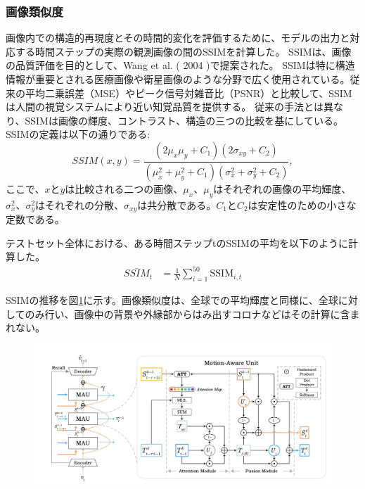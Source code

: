       \subsubsection{画像類似度}
        画像内での構造的再現度とその時間的変化を評価するために、モデルの出力と対応する時間ステップの実際の観測画像の間のSSIMを計算した。
        SSIMは、画像の品質評価を目的として、Wang et al. ( 2004 )\cite{wang2004image}で提案された。
        SSIMは特に構造情報が重要とされる医療画像や衛星画像のような分野で広く使用されている。従来の平均二乗誤差（MSE）やピーク信号対雑音比（PSNR）と比較して、SSIMは人間の視覚システムにより近い知覚品質を提供する。
        従来の手法とは異なり、SSIMは画像の輝度、コントラスト、構造の三つの比較を基にしている。
        SSIMの定義は以下の通りである:
        \begin{equation}
          SSIM(x, y) = \frac{(2\mu_x \mu_y + C_1)(2\sigma_{xy} + C_2)}{(\mu_x^2 + \mu_y^2 + C_1)(\sigma_x^2 + \sigma_y^2 + C_2)},     
        \end{equation}
        ここで、$x$と$y$は比較される二つの画像、$\mu_x$、$\mu_y$はそれぞれの画像の平均輝度、$\sigma_x^2$、$\sigma_y^2$はそれぞれの分散、$\sigma_{xy}$は共分散である。$C_1$と$C_2$は安定性のための小さな定数である。
        
        テストセット全体における、ある時間ステップtのSSIMの平均を以下のように計算した。
        \begin{align}
          \bar{SSIM}_{t} & = \frac{1}{N} \sum_{i=1}^{50} \text{SSIM}_{i,t}
        \end{align}

        SSIMの推移を図\ref{fig:exp1_ssim_line}に示す。画像類似度は、全球での平均輝度と同様に、全球に対してのみ行い、画像中の背景や外縁部からはみ出すコロナなどはその計算に含まれない。

        \begin{figure}[h]
          \centering
          \includegraphics[width=150mm]{figures/mau.png}
          \caption{}
          \label{fig:exp1_ssim_line}
        \end{figure}

